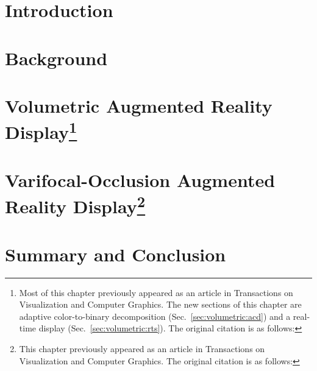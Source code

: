 





%

\chapter{Introduction}
\label{chapter:introduction}


\chapter{Background}
\label{chapter:background}


\chapter[Volumetric Augmented Reality Display]{Volumetric Augmented Reality Display\footnote{Most of this chapter previously appeared as an article in Transactions on Visualization and Computer Graphics. The new sections of this chapter are adaptive color-to-binary decomposition (Sec.~\ref{sec:volumetric:acd}) and a real-time display (Sec.~\ref{sec:volumetric:rts}). The original citation is as follows: }}
\label{chapter:volumetric_ned}


\chapter[Varifocal-Occlusion Augmented Reality Display]{Varifocal-Occlusion Augmented Reality Display\footnote{This chapter previously appeared as an article in Transactions on Visualization and Computer Graphics. The original citation is as follows: }}
\label{chapter:varifocal_occlusion_ned}


\chapter{Summary and Conclusion}
\label{chapter:summary}




\appendix



